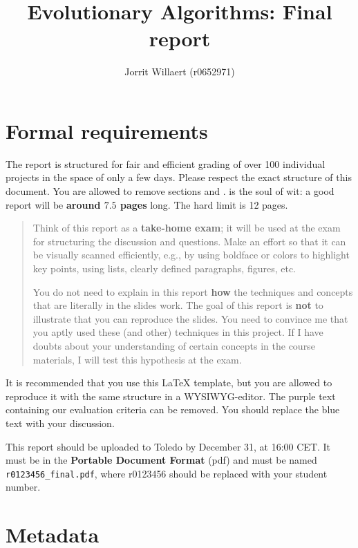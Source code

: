 \documentclass[a4paper,10pt]{article}
\title{Evolutionary Algorithms: Final report}
\author{Jorrit Willaert (r0652971)}
\newcommand{\thisyear}{\the\year}
\newcommand{\deadlineCode}{December 31, \thisyear{} at 16:00 CET}
\newcommand{\deadlineReport}{\deadlineCode}
\newcommand{\RemoveMe}[1]{{\color{purple}#1}}
\begin{document}
\selectfont{}

\maketitle


\section{\RemoveMe{Formal requirements}} \label{sec_this}

\RemoveMe{The report is structured for fair and efficient grading of over 100 individual projects in the space of only a few days. Please respect the exact structure of this document. You are allowed to remove sections and . is the soul of wit: a good report will be \textbf{around $7.5$ pages} long. The hard limit is 12 pages. 

\begin{quote}
Think of this report as a \textbf{take-home exam}; it will be used at the exam for structuring the discussion and questions. Make an effort so that it can be visually scanned efficiently, e.g., by using boldface or colors to highlight key points, using lists, clearly defined paragraphs, figures, etc.

You do not need to explain in this report \textbf{how} the techniques and concepts that are literally in the slides work. The goal of this report is \textbf{not} to illustrate that you can reproduce the slides. You need to convince me that you aptly used these (and other) techniques in this project. If I have doubts about your understanding of certain concepts in the course materials, I will test this hypothesis at the exam.
\end{quote}

It is recommended that you use this \LaTeX{} template, but you are allowed to reproduce it with the same structure in a WYSIWYG-editor. The purple text containing our evaluation criteria can be removed. You should replace the blue text with your discussion.

This report should be uploaded to Toledo by \deadlineReport. It must be in the \textbf{Portable Document Format} (pdf) and must be named \texttt{r0123456\_final.pdf}, where r0123456 should be replaced with your student number.}

\section{Metadata}
\end{document}
